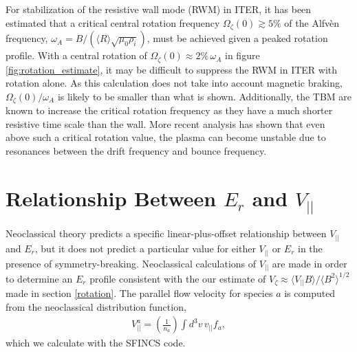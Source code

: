 \documentclass[aip, pop, preprint]{revtex4-1}
\numberwithin{figure}{section}
\numberwithin{equation}{section}
\begin{document}
For stabilization of the resistive wall mode (RWM) in ITER, it has been estimated that a critical central rotation frequency $ \Omega_{\zeta}(0) \gtrsim 5\%$ of the Alfv\`{e}n frequency, $\omega_A = B/(\langle R\rangle\sqrt{\mu_0 \rho_i})$, must be achieved given a peaked rotation profile.\cite{Liu2004} With a central rotation of $\Omega_{\zeta}(0) \approx 2\% \, \omega_A$ in figure \ref{fig:rotation_estimate}, it may be difficult to suppress the RWM in ITER with rotation alone. As this calculation does not take into account magnetic braking, $\Omega_{\zeta}(0)/\omega_A$ is likely to be smaller than what is shown. Additionally, the TBM are known to increase the critical rotation frequency as they have a much shorter resistive time scale than the wall.\cite{Liu2004} More recent analysis has shown that even above such a critical rotation value, the plasma can become unstable due to resonances between the drift frequency and bounce frequency.\cite{Berkery2010, Liu2009}

\FloatBarrier

\section{Relationship Between $E_r$ and $V_{||}$}\label{Erandv}
Neoclassical theory predicts a specific linear-plus-offset relationship between $V_{||}$ and $E_r$, but it does not predict a particular value for either $V_{||}$ or $E_r$ in the presence of symmetry-breaking. Neoclassical calculations of $V_{||}$ are made in order to determine an $E_r$ profile consistent with the our estimate of $V_{\zeta} \approx \langle V_{||} B \rangle/\langle B^2 \rangle^{1/2}$ made in section \ref{rotation}. The parallel flow velocity for species $a$ is computed from the neoclassical distribution function,
\begin{gather}
V^a_{||} = \left(\frac{1}{n_a}\right) \int d^3 v \, v_{||} f_a,
\label{eq:parallelflow}
\end{gather}
which we calculate with the SFINCS \cite{Landreman2014} code. 
\end{document}
